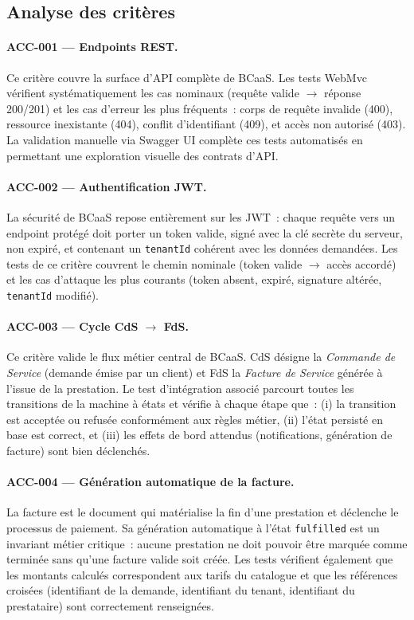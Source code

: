 \subsection{Analyse des critères}
\label{subsec:criteres-analyse}

\paragraph{ACC-001 — Endpoints REST.}
Ce critère couvre la surface d'API complète de BCaaS. Les tests WebMvc vérifient
systématiquement les cas nominaux (requête valide $\rightarrow$ réponse 200/201) et les
cas d'erreur les plus fréquents~: corps de requête invalide (400), ressource inexistante
(404), conflit d'identifiant (409), et accès non autorisé (403). La validation manuelle
via Swagger UI complète ces tests automatisés en permettant une exploration visuelle
des contrats d'API.

\paragraph{ACC-002 — Authentification JWT.}
La sécurité de BCaaS repose entièrement sur les JWT~: chaque requête vers un endpoint
protégé doit porter un token valide, signé avec la clé secrète du serveur, non expiré, et
contenant un \texttt{tenantId} cohérent avec les données demandées. Les tests de ce critère
couvrent le chemin nominale (token valide $\rightarrow$ accès accordé) et les cas
d'attaque les plus courants (token absent, expiré, signature altérée, \texttt{tenantId}
modifié).

\paragraph{ACC-003 — Cycle CdS $\rightarrow$ FdS.}
Ce critère valide le flux métier central de BCaaS. CdS désigne la \textit{Commande de
Service} (demande émise par un client) et FdS la \textit{Facture de Service} générée à
l'issue de la prestation. Le test d'intégration associé parcourt toutes les transitions de
la machine à états et vérifie à chaque étape que~: (i) la transition est acceptée ou
refusée conformément aux règles métier, (ii) l'état persisté en base est correct, et (iii)
les effets de bord attendus (notifications, génération de facture) sont bien déclenchés.

\paragraph{ACC-004 — Génération automatique de la facture.}
La facture est le document qui matérialise la fin d'une prestation et déclenche le
processus de paiement. Sa génération automatique à l'état \texttt{fulfilled} est un
invariant métier critique~: aucune prestation ne doit pouvoir être marquée comme terminée
sans qu'une facture valide soit créée. Les tests vérifient également que les montants
calculés correspondent aux tarifs du catalogue et que les références croisées
(identifiant de la demande, identifiant du tenant, identifiant du prestataire) sont
correctement renseignées.

